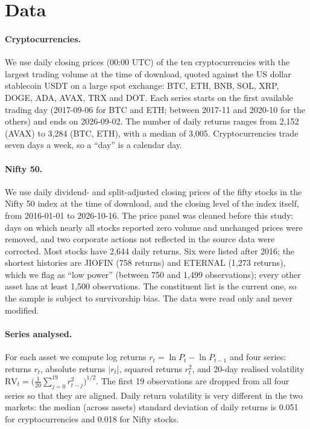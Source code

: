 \documentclass[11pt,a4paper]{article}
\begin{document}
\section{Data}\label{sec:data}

\paragraph{Cryptocurrencies.} We use daily closing prices (00:00 UTC) of the ten cryptocurrencies with the largest
trading volume at the time of download, quoted against the US dollar stablecoin USDT on a large spot exchange:
BTC, ETH, BNB, SOL, XRP, DOGE, ADA, AVAX, TRX and DOT. Each series starts on the first available trading day
(2017-09-06 for BTC and ETH; between 2017-11 and 2020-10 for the others) and ends on 2026-09-02. The number of daily
returns ranges from 2,152 (AVAX) to 3,284 (BTC, ETH), with a median of 3,005. Cryptocurrencies trade seven days a
week, so a ``day'' is a calendar day.

\paragraph{Nifty 50.} We use daily dividend- and split-adjusted closing prices of the fifty stocks in the Nifty 50
index at the time of download, and the closing level of the index itself, from 2016-01-01 to 2026-10-16. The price
panel was cleaned before this study: days on which nearly all stocks reported zero volume and unchanged prices were
removed, and two corporate actions not reflected in the source data were corrected. Most stocks have 2,644 daily
returns. Six were listed after 2016; the shortest histories are JIOFIN (758 returns) and ETERNAL (1,273 returns),
which we flag as ``low power'' (between 750 and 1,499 observations); every other asset has at least 1,500
observations. The constituent list is the current one, so the sample is subject to survivorship bias. The data were
read only and never modified.

\paragraph{Series analysed.} For each asset we compute log returns $r_t=\ln P_t-\ln P_{t-1}$ and four series:
returns $r_t$, absolute returns $|r_t|$, squared returns $r_t^2$, and 20-day realised volatility
$\mathrm{RV}_t=\big(\tfrac{1}{20}\sum_{j=0}^{19} r_{t-j}^2\big)^{1/2}$. The first 19 observations are dropped from all
four series so that they are aligned. Daily return volatility is very different in the two markets: the median
(across assets) standard deviation of daily returns is 0.051 for cryptocurrencies and 0.018 for Nifty stocks.
\end{document}
